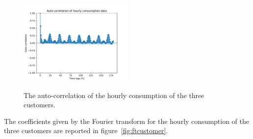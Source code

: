 \begin{figure}[H]
\begin{minipage}[b]{8.5cm}
\label{fig:correlationcustomer2}
\end{minipage}
\begin{minipage}[b]{17cm}
\centering
\includegraphics[width=0.5\textwidth]{images/baseline/hourly_correlation_week_range_customer3}
\label{fig:correlationcustomer3}
\end{minipage}
\label{fig:correlationcustomer}
\caption{The auto-correlation of the hourly consumption of the three customers.}
\end{figure}

The coefficients given by the Fourier transform for the hourly consumption of the three customers are reported in figure~\ref{fig:ftcustomer}. %

